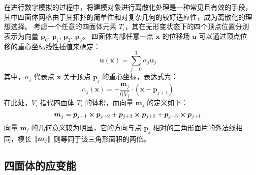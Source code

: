 在进行数字模拟的过程中，将建模对象进行离散化处理是一种常见且有效的手段，其中四面体网格由于其拓扑的简单性和对复杂几何的较好适应性，成为离散化的理想选择。
考虑一个任意的四面体元素 $T_i$，其在无形变状态下的四个顶点位置分别表示为向量 $\bm{p}_0$, $\bm{p}_1$, $\bm{p}_2$, $\bm{p}_3$。
四面体内部任意一点 $\bm{x}$ 的位移场 $\bm{u}$ 可以通过顶点位移的重心坐标线性插值来确定：
\begin{equation}
  \bm{u}(\bm{x}) = \sum_{j = 0}^3 \alpha_j \bm{u}_j
\end{equation}
其中，$\alpha_j$ 代表点 $\bm{x}$ 关于顶点 $\bm{p}_j$ 的重心坐标，表达式为：
\begin{equation}
  \alpha_j(\bm{x}) = - \frac{\bm{m}_j}{6 V_i} \cdot (\bm{x} - \bm{p}_{j + 1})
\end{equation}
在此处，$V_i$ 指代四面体 $T_i$ 的体积，而向量 $\bm{m}_j$ 的定义如下：
\begin{equation}
  \bm{m}_j
  = \bm{p}_{j + 1} \cp \bm{p}_{j + 2} + \bm{p}_{j + 2} \cp \bm{p}_{j + 3} + \bm{p}_{j + 3} \cp \bm{p}_{j + 1}
\end{equation}
向量 $\bm{m}_j$ 的几何意义较为明显，它的方向与点 $\bm{p}_{j}$ 相对的三角形面片的外法线相同，模长 $\norm{\bm{m}_j}$ 则等同于该三角形面积的两倍。

\subsection{四面体的应变能}

